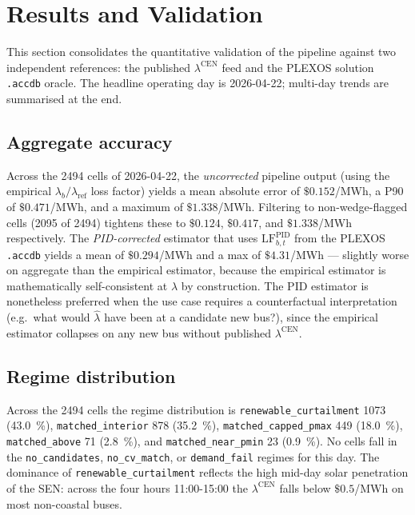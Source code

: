 \section{Results and Validation}
\label{sec:results}

This section consolidates the quantitative validation of the
pipeline against two independent references: the published
$\lambda^{\mathrm{CEN}}$ feed and the PLEXOS solution
\texttt{.accdb} oracle.  The headline operating day is
2026-04-22; multi-day trends are summarised at the end.

\subsection{Aggregate accuracy}
Across the \num{2494} cells of 2026-04-22, the
\textit{uncorrected} pipeline output (using the empirical
$\lambda_b/\lambda_{\mathrm{ref}}$ loss factor) yields a mean
absolute error of $\$0.152$/MWh, a P90 of $\$0.471$/MWh, and a
maximum of $\$1.338$/MWh.  Filtering to non-wedge-flagged cells
(\num{2095} of \num{2494}) tightens these to $\$0.124$,
$\$0.417$, and $\$1.338$/MWh respectively.  The
\textit{PID-corrected} estimator that uses
$\mathrm{LF}^{\mathrm{PID}}_{b,t}$ from the PLEXOS \texttt{.accdb}
yields a mean of $\$0.294$/MWh and a max of $\$4.31$/MWh — slightly
worse on aggregate than the empirical estimator, because the
empirical estimator is mathematically self-consistent at $\lambda$
by construction.  The PID estimator is nonetheless preferred when
the use case requires a counterfactual interpretation
(e.g.\ what would $\hat\lambda$ have been at a candidate new
bus?), since the empirical estimator collapses on any new bus
without published $\lambda^{\mathrm{CEN}}$.

\subsection{Regime distribution}
Across the \num{2494} cells the regime distribution is
\texttt{renewable\_curtailment} \num{1073} (\SI{43.0}{\percent}),
\texttt{matched\_interior} \num{878} (\SI{35.2}{\percent}),
\texttt{matched\_capped\_pmax} \num{449} (\SI{18.0}{\percent}),
\texttt{matched\_above} \num{71} (\SI{2.8}{\percent}), and
\texttt{matched\_near\_pmin} \num{23} (\SI{0.9}{\percent}).  No
cells fall in the \texttt{no\_candidates}, \texttt{no\_cv\_match},
or \texttt{demand\_fail} regimes for this day.  The dominance of
\texttt{renewable\_curtailment} reflects the high mid-day solar
penetration of the SEN: across the four hours
\num{11}{:}\num{00}{-}\num{15}{:}\num{00} the
$\lambda^{\mathrm{CEN}}$ falls below $\$0.5$/MWh on most non-coastal
buses.

